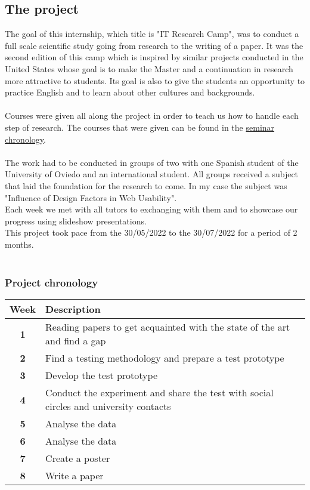 \documentclass{article}
\begin{document}
\subsection{The project}
The goal of this internship, which title is "IT Research Camp", was to conduct a full scale scientific study going from research to the writing of a paper.
It was the second edition of this camp which is inspired by similar projects conducted in the United States whose goal is to make the Master and a continuation in research more attractive to students. Its goal is also to give the students an opportunity to practice English and to learn about other cultures and backgrounds.
\\\\
Courses were given all along the project in order to teach us how to handle each step of research.
The courses that were given can be found in the \hyperlink{sem_chron}{seminar chronology}.
\\\\
The work had to be conducted in groups of two with one Spanish student of the University of Oviedo and an international student.
All groups received a subject that laid the foundation for the research to come. In my case the subject was "Influence of Design Factors in Web Usability".
\\
Each week we met with all tutors to exchanging with them and to showcase our progress using slideshow presentations.
\\
This project took pace from the 30/05/2022 to the 30/07/2022 for a period of 2 months.
\\\\


\subsubsection{Project chronology}


\begin{table}[H]
\centering
\begin{tabular}{ |c|l| } 
    \hline
    \textbf{Week} & \textbf{Description}\\
    \hline\hline
    \textbf{1} & Reading papers to get acquainted with the state of the art and find a gap \\
    \hline
    \textbf{2} & Find a testing methodology and prepare a test prototype \\
    \hline
    \textbf{3} & Develop the test prototype \\
    \hline
    \textbf{4} & Conduct the experiment and share the test with social circles and university contacts \\
    \hline
    \textbf{5} & Analyse the data \\
    \hline
    \textbf{6} & Analyse the data \\
    \hline
    \textbf{7} & Create a poster \\
    \hline
    \textbf{8} & Write a paper \\
    \hline
\end{tabular}
\end{table}
\end{document}
